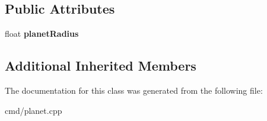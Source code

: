 \subsection*{Public Attributes}
\begin{DoxyCompactItemize}
\item 
float {\bfseries planet\+Radius}\hypertarget{classAtmosphereHalo_a29c81b5d1ccb3431e9bc37617cba41d0}{}\label{classAtmosphereHalo_a29c81b5d1ccb3431e9bc37617cba41d0}

\end{DoxyCompactItemize}
\subsection*{Additional Inherited Members}


The documentation for this class was generated from the following file\+:\begin{DoxyCompactItemize}
\item 
cmd/planet.\+cpp\end{DoxyCompactItemize}
